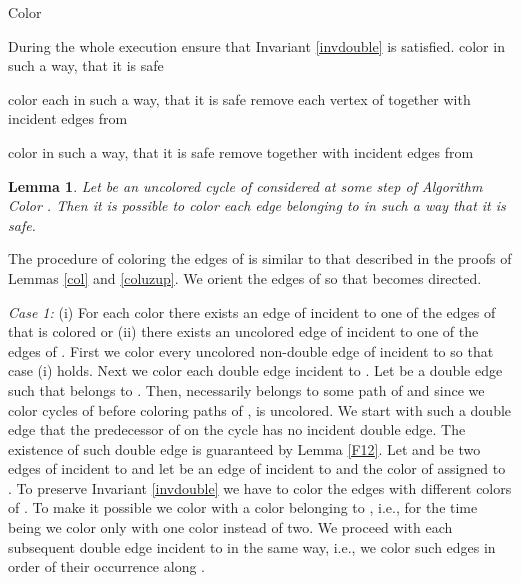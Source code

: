 \documentclass[a4, 11pt]{article}
\newcommand{\dowod}{\noindent{\bf Proof.~}}
\newcommand{\<}{\langle}
\renewcommand{\>}{\rangle}
\newtheorem{lemma}{Lemma}
\begin{document}
\begin{algorithm}
  \caption{Color }
  \label{alg:col_gprim2}
  \begin{algorithmic}
	  \State During the whole execution ensure that Invariant \ref{invdouble} is satisfied. 
      \For{}
        \State color  in such a way, that it is safe
      \EndFor
    \EndWhile 
    
        \State color each  in such a way, that it is safe
      \EndFor
      \State remove each vertex of  together with incident edges from 
    \EndWhile
    
        \State color   in such a way, that it is safe
      \EndFor
      \State remove  together with incident edges from 
    \EndWhile
		
		
    \end{algorithmic}
\end{algorithm}




\begin{lemma} \label{cykl45}
Let  be an uncolored cycle  of  considered at some step of Algorithm Color . Then it is possible to color each edge belonging to  in such a way that it is safe.
\end{lemma}
\dowod The procedure of coloring the edges of  is similar to that described in the proofs of Lemmas \ref{col} and \ref{coluzup}. 
We orient the edges of  so that  becomes directed. 

{\em Case 1:} (i) For each color  there exists an edge of  incident to one of the edges of  that is colored   or (ii) there exists an uncolored edge of  incident to one of the edges of . 
First we color every uncolored non-double edge  of  incident to  so that case (i) holds. Next we color each double edge incident to .
Let  be a double edge such that  belongs to . Then, necessarily   belongs to some path of  and since we color cycles of  before coloring paths of ,  is uncolored. We start with such a double edge  that the predecessor  of  on the cycle  has no incident double edge. The existence of such double edge is guaranteed by Lemma \ref{F12}. Let  and  be two edges of  incident to  and let  be an edge of  incident to  and  the color of  assigned to .  To preserve Invariant \ref{invdouble} we  have to color the edges  with different colors of . To make it possible we color  with a color  belonging to , i.e., for the time being we color  only with one color instead of two.  
We proceed with each subsequent double edge incident to  in the same way, i.e., we color such edges in order of their occurrence along . 
\end{document}
